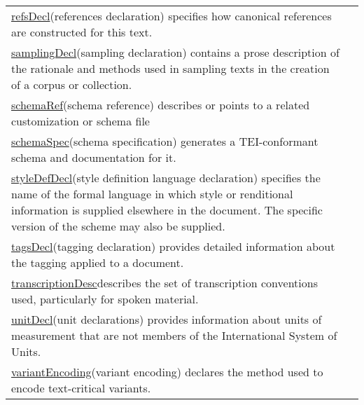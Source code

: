 \begin{sansreflist}
\begin{longtable}{P{0.1777151799687011\textwidth}P{0.6722848200312989\textwidth}}
\hyperref[TEI.refsDecl]{refsDecl}\tabcellsep (references declaration) specifies how canonical references are constructed for this text.\\
\hyperref[TEI.samplingDecl]{samplingDecl}\tabcellsep (sampling declaration) contains a prose description of the rationale and methods used in sampling texts in the creation of a corpus or collection.\\
\hyperref[TEI.schemaRef]{schemaRef}\tabcellsep (schema reference) describes or points to a related customization or schema file\\
\hyperref[TEI.schemaSpec]{schemaSpec}\tabcellsep (schema specification) generates a TEI-conformant schema and documentation for it.\\
\hyperref[TEI.styleDefDecl]{styleDefDecl}\tabcellsep (style definition language declaration) specifies the name of the formal language in which style or renditional information is supplied elsewhere in the document. The specific version of the scheme may also be supplied.\\
\hyperref[TEI.tagsDecl]{tagsDecl}\tabcellsep (tagging declaration) provides detailed information about the tagging applied to a document.\\
\hyperref[TEI.transcriptionDesc]{transcriptionDesc}\tabcellsep describes the set of transcription conventions used, particularly for spoken material.\\
\hyperref[TEI.unitDecl]{unitDecl}\tabcellsep (unit declarations) provides information about units of measurement that are not members of the International System of Units.\\
\hyperref[TEI.variantEncoding]{variantEncoding}\tabcellsep (variant encoding) declares the method used to encode text-critical variants.\end{longtable} \par
 

\end{sansreflist}
